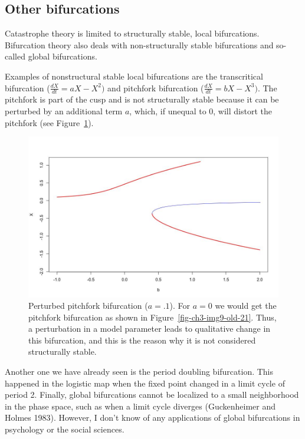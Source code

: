\documentclass[
  a4paper,
  DIV=11,
  numbers=noendperiod]{scrreprt}
\begin{document}
\hypertarget{sec-Other-bifurcations}{%
\subsection{Other bifurcations}\label{sec-Other-bifurcations}}

Catastrophe theory is limited to structurally stable, local
bifurcations. Bifurcation theory also deals with non-structurally stable
bifurcations and so-called global bifurcations.

Examples of nonstructural stable local bifurcations are the
transcritical bifurcation (\(\frac{dX}{dt} = aX - X^{2})\) and pitchfork
bifurcation (\(\frac{dX}{dt} = bX - X^{3})\). The pitchfork is part of
the cusp and is not structurally stable because it can be perturbed by
an additional term \(a\), which, if unequal to 0, will distort the
pitchfork (see Figure~\ref{fig-ch3-img15-old-27}).

\begin{figure}

{\centering \includegraphics{media/ch3/image15.jpg}

}

\caption{\label{fig-ch3-img15-old-27}Perturbed pitchfork bifurcation
(\(a = .1\)). For \(a = 0\) we would get the pitchfork bifurcation as
shown in Figure~\ref{fig-ch3-img9-old-21}. Thus, a perturbation in a
model parameter leads to qualitative change in this bifurcation, and
this is the reason why it is not considered structurally stable.}

\end{figure}

Another one we have already seen is the period doubling bifurcation.
This happened in the logistic map when the fixed point changed in a
limit cycle of period 2. Finally, global bifurcations cannot be
localized to a small neighborhood in the phase space, such as when a
limit cycle diverges (Guckenheimer and Holmes 1983). However, I don't
know of any applications of global bifurcations in psychology or the
social sciences.
\end{document}
